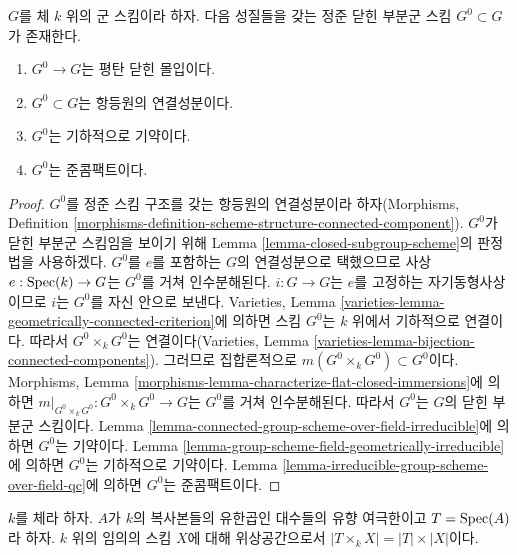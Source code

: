 \begin{proposition}
\label{proposition-connected-component}
$G$를 체 $k$ 위의 군 스킴이라 하자. 다음 성질들을 갖는 정준 닫힌 부분군 스킴
$G^0 \subset G$가 존재한다.
\begin{enumerate}
\item $G^0 \to G$는 평탄 닫힌 몰입이다.
\item $G^0 \subset G$는 항등원의 연결성분이다.
\item $G^0$는 기하적으로 기약이다.
\item $G^0$는 준콤팩트이다.
\end{enumerate}
\end{proposition}

\begin{proof}
$G^0$를 정준 스킴 구조를 갖는 항등원의 연결성분이라 하자(Morphisms, Definition
\ref{morphisms-definition-scheme-structure-connected-component}). $G^0$가 닫힌 부분군 스킴임을 보이기 위해
Lemma \ref{lemma-closed-subgroup-scheme}의 판정법을 사용하겠다. $G^0$를 $e$를 포함하는 $G$의 연결성분으로
택했으므로 사상 $e : \mathop{\mathrm{Spec}}(k) \to G$는 $G^0$를 거쳐 인수분해된다. $i : G \to G$는 $e$를 고정하는
자기동형사상이므로 $i$는 $G^0$를 자신 안으로 보낸다. Varieties, Lemma
\ref{varieties-lemma-geometrically-connected-criterion}에 의하면 스킴 $G^0$는 $k$ 위에서 기하적으로 연결이다.
따라서 $G^0 \times_k G^0$는 연결이다(Varieties, Lemma
\ref{varieties-lemma-bijection-connected-components}). 그러므로 집합론적으로
$m(G^0 \times_k G^0) \subset G^0$이다. Morphisms, Lemma
\ref{morphisms-lemma-characterize-flat-closed-immersions}에 의하면
$m|_{G^0 \times_k G^0} : G^0 \times_k G^0 \to G$는 $G^0$를 거쳐 인수분해된다.
따라서 $G^0$는 $G$의 닫힌 부분군 스킴이다. Lemma
\ref{lemma-connected-group-scheme-over-field-irreducible}에 의하면 $G^0$는 기약이다. Lemma
\ref{lemma-group-scheme-field-geometrically-irreducible}에 의하면 $G^0$는 기하적으로 기약이다. Lemma
\ref{lemma-irreducible-group-scheme-over-field-qc}에 의하면 $G^0$는 준콤팩트이다.
\end{proof}

\begin{lemma}
\label{lemma-profinite-product-over-field}
$k$를 체라 하자. $A$가 $k$의 복사본들의 유한곱인 대수들의 유향 여극한이고
$T = \mathop{\mathrm{Spec}}(A)$라 하자. $k$ 위의 임의의 스킴 $X$에 대해 위상공간으로서
$|T \times_k X| = |T| \times |X|$이다.
\end{lemma}

